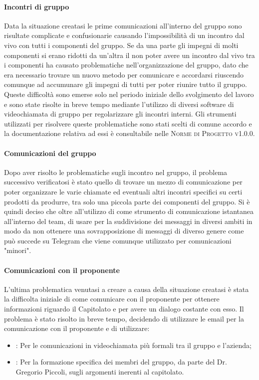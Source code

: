 \documentclass[../piano-di-qualifica.tex]{subfiles}
\begin{document}
\paragraph{Incontri di gruppo}
\label{sub:incontri_di_gruppo}
Data la situazione creatasi le prime comunicazioni all'interno del gruppo sono risultate complicate e confusionarie causando l'impossibilità di un incontro dal vivo con tutti i componenti del gruppo.
Se da una parte gli impegni di molti componenti si erano ridotti da un'altra il non poter avere un incontro dal vivo tra i componenti ha causato problematiche nell'organizzazione del gruppo, dato che era necessario trovare un nuovo metodo per comunicare e accordarsi riuscendo comunque ad accumunare gli impegni di tutti per poter riunire tutto il gruppo.
Queste difficoltà sono emerse solo nel periodo iniziale dello svolgimento del lavoro e sono state risolte in breve tempo mediante l'utilizzo di diversi software di videochiamata di gruppo per regolarizzare gli incontri interni.
Gli strumenti utilizzati per risolvere queste problematiche sono stati scelti di comune accordo e la documentazione relativa ad essi è consultabile nelle \textsc{Norme di Progetto v1.0.0}.

\paragraph{Comunicazioni del gruppo}
\label{sub:comunicazione_del_gruppo}
Dopo aver risolto le problematiche sugli incontro nel gruppo, il problema successivo verificatosi è stato quello di trovare un mezzo di comunicazione per poter organizzare le varie chiamate ed eventuali altri incontri specifici su certi prodotti da produrre, tra solo una piccola parte dei componenti del gruppo.
Si è quindi deciso che oltre all'utilizzo di  come strumento di comunicazione istantanea all'interno del team, di usare  per la suddivisione dei messaggi in diversi ambiti in modo da non ottenere una sovrapposizione di messaggi di diverso genere come può succede su Telegram che viene comunque utilizzato per comunicazioni "minori".

\paragraph{Comunicazioni con il proponente}
\label{sub:comunicazione_con_il_proponente}
L'ultima problematica venutasi a creare a causa della situazione creatasi è stata la difficolta iniziale di come comunicare con il proponente per ottenere informazioni riguardo il Capitolato e per avere un dialogo costante con esso.
Il problema è stato risolto in breve tempo, decidendo di utilizzare le email per la comunicazione con il proponente e di utilizzare:
\begin{itemize}
    \item \textbf{}: Per le comunicazioni in videochiamata più formali tra il gruppo e l'azienda;
    \item \textbf{}: Per la formazione specifica dei membri del gruppo, da parte del Dr. Gregorio Piccoli, sugli argomenti inerenti al capitolato.
\end{itemize}
\end{document}
